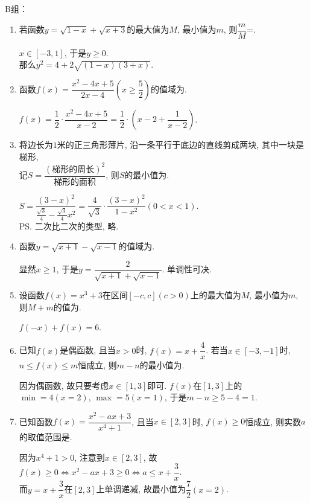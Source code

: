 B组：
\begin{enumerate}
\item 若函数$y=\sqrt{1-x}+\sqrt{x+3}$的最大值为$M$, 最小值为$m$, 则$\dfrac{m}{M}$=. 
\begin{jieda}
$x\in[-3,1]$, 于是$y\geq 0$. \\
那么$y^2=4+2\sqrt{(1-x)(3+x)}$. 
\end{jieda}

\item 函数$f(x)=\dfrac{x^2-4x+5}{2x-4}\left(x\geq\dfrac{5}{2}\right)$的值域为\blkda{$[1,+\infty)$}. 
\begin{jieda}
$f(x)=\dfrac{1}{2}\cdot\dfrac{x^2-4x+5}{x-2}=\dfrac{1}{2}\cdot\left(x-2+\dfrac{1}{x-2}\right)$. 
\end{jieda}


\item 将边长为$1$米的正三角形薄片, 沿一条平行于底边的直线剪成两块, 其中一块是梯形, \\
记$S=\dfrac{(\text{梯形的周长})^2}{\text{梯形的面积}}$, 则$S$的最小值为. 
\begin{jieda}
$S=\dfrac{(3-x)^2}{\frac{\sqrt{3}}{4}-\frac{\sqrt{3}}{4}x^2}=\dfrac{4}{\sqrt{3}}\cdot\dfrac{(3-x)^2}{1-x^2}(0<x<1)$. \\
\ps 二次比二次的类型, 略. 
\end{jieda}


\item 函数$y=\sqrt{x+1}-\sqrt{x-1}$的值域为\blkda{$(0,\sqrt{2}]$}.
\begin{jieda}
显然$x\geq 1$, 于是$y=\dfrac{2}{\sqrt{x+1}+\sqrt{x-1}}$. 单调性可决. 
\end{jieda}


\item 设函数$f(x)=x^3+3$在区间$[-c,c](c>0)$上的最大值为$M$, 最小值为$m$, 则$M+m$的值为.
\begin{jieda}
$f(-x)+f(x)=6$. 
\end{jieda}


\item 已知$f(x)$是偶函数, 且当$x>0$时, $f(x)=x+\dfrac{4}{x}$. 若当$x\in[-3,-1]$时, $n\leq f(x)\leq m$恒成立, 则$m-n$的最小值为.
\begin{jieda}
因为偶函数, 故只要考虑$x\in[1,3]$即可. $f(x)$在$[1,3]$上的$\min=4(x=2)$, $\max=5(x=1)$, 于是$m-n\geq 5-4=1$. 
\end{jieda}


\item 已知函数$f(x)=\dfrac{x^2-ax+3}{x^4+1}$, 且当$x\in[2,3]$时, $f(x)\geq 0$恒成立, 则实数$a$的取值范围是\blkda{$\left(-\infty,\frac{7}{2}\right]$}.
\begin{jieda}
因为$x^4+1>0$, 注意到$x\in[2,3]$, 故$f(x)\geq 0\iff x^2-ax+3\geq 0\iff a\leq x+\dfrac{3}{x}$. \\
而$y=x+\dfrac{3}{x}$在$[2,3]$上单调递减, 故最小值为$\dfrac{7}{2}(x=2)$. 
\end{jieda}


\end{enumerate}
